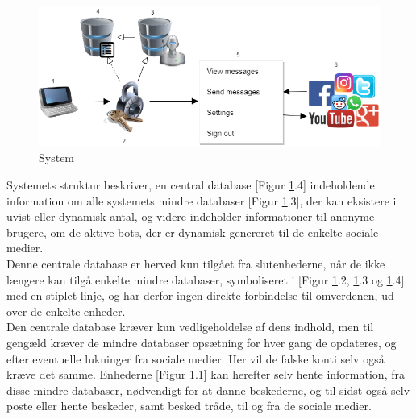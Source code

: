 \begin{figure}[H]
    \centering
    \includegraphics[width=0.70\linewidth]{Projectdoc/Assets/Illustrationer/System_struckure.png}
    \caption{System}
    \label{fig:sysdiagram}
\end{figure}

Systemets struktur beskriver, en central database [Figur \ref{fig:sysdiagram}.4] indeholdende information om alle systemets mindre databaser [Figur \ref{fig:sysdiagram}.3], der kan eksistere i uvist eller dynamisk antal, og videre indeholder informationer til anonyme brugere, om de aktive bots, der er dynamisk genereret til de enkelte sociale medier.\\
Denne centrale database er herved kun tilgået fra slutenhederne, når de ikke længere kan tilgå enkelte mindre databaser, symboliseret i [Figur \ref{fig:sysdiagram}.2, \ref{fig:sysdiagram}.3 og \ref{fig:sysdiagram}.4] med en stiplet linje, og har derfor ingen direkte forbindelse til omverdenen, ud over de enkelte enheder.\\
Den centrale database kræver kun vedligeholdelse af dens indhold, men til gengæld kræver de mindre databaser opsætning for hver gang de opdateres, og efter eventuelle lukninger fra sociale medier. Her vil de falske konti selv også kræve det samme.
Enhederne [Figur \ref{fig:sysdiagram}.1] kan herefter selv hente information, fra disse mindre databaser, nødvendigt for at danne beskederne, og til sidst også selv poste eller hente beskeder, samt besked tråde, til og fra de sociale medier.